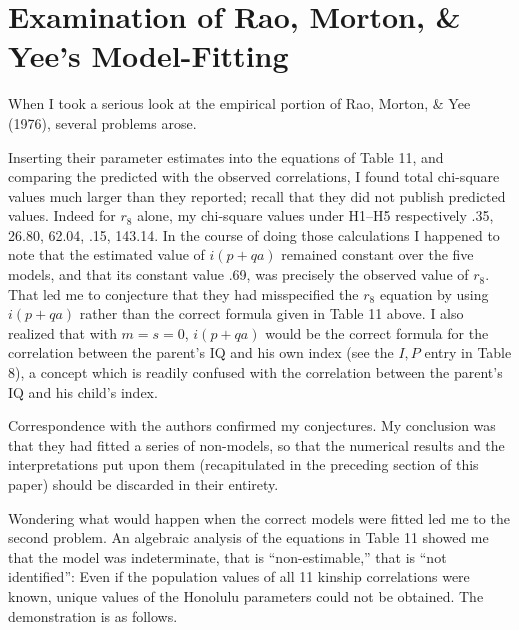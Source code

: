 ﻿\documentclass[12pt]{article}
\begin{document}
\section{Examination of Rao, Morton, \& Yee's Model-Fitting}

When I took a serious look at the empirical portion of Rao, Morton, \& Yee (1976), several problems arose.

Inserting their parameter estimates into the equations of Table 11, and comparing the predicted with the observed correlations, I found total chi-square values much larger than they reported; recall that they did not publish predicted values. Indeed for $r_8$ alone, my chi-square values under H1--H5 respectively .35, 26.80, 62.04, .15, 143.14. In the course of doing those calculations I happened to note that the estimated value of $i(p+qa)$ remained constant over the five models, and that its constant value .69, was precisely the observed value of $r_8$. That led me to conjecture that they had misspecified the $r_8$ equation by using $i(p+qa)$ rather than the correct formula given in Table 11 above. I also realized that with $m=s=0$, $i(p+qa)$ would be the correct formula for the correlation between the parent's IQ and his own index (see the $I,P$ entry in Table 8), a concept which is readily confused with the correlation between the parent's IQ and his child's index.

Correspondence with the authors confirmed my conjectures. My conclusion was that they had fitted a series of non-models, so that the numerical results and the interpretations put upon them (recapitulated in the preceding section of this paper) should be discarded in their entirety.

Wondering what would happen when the correct models were fitted led me to the second problem. An algebraic analysis of the equations in Table 11 showed me that the model was indeterminate, that is ``non-estimable,'' that is ``not identified'': Even if the population values of all 11 kinship correlations were known, unique values of the Honolulu parameters could not be obtained. The demonstration is as follows.
\end{document}
